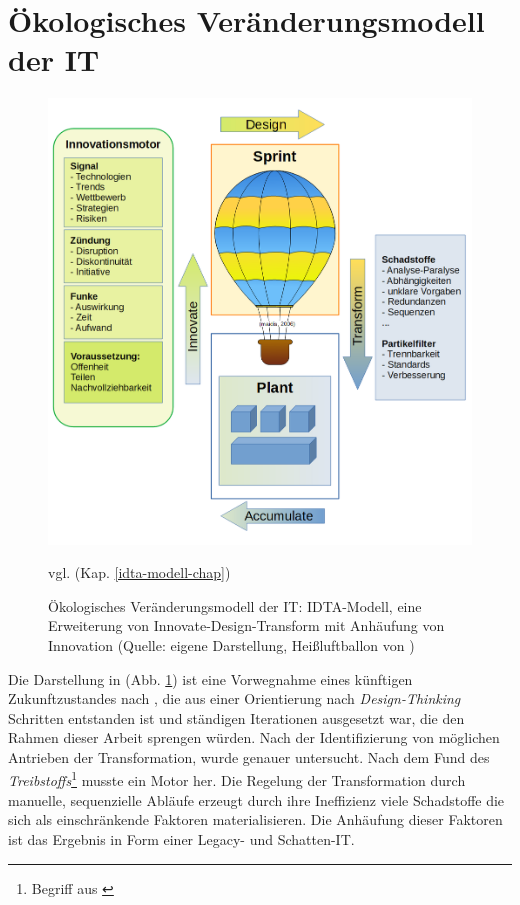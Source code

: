 \section{Ökologisches Veränderungsmodell der IT}
\begin{figure}[htbp]
 \centering
 \includegraphics[width=1.0\textwidth]{gfx/digital-transformation-lifecycle-by-selim4.PNG}
 \caption{Ökologisches Veränderungsmodell der IT: IDTA-Modell, eine Erweiterung von Innovate-Design-Transform \cite{Koch2016} mit Anhäufung von Innovation \cite{Ganswindt2006} (Quelle: eigene Darstellung, Heißluftballon von \citet{maidis_2006})\label{fig:digit-trans-idt}
 } vgl. (Kap. \ref{idta-modell-chap})
 \end{figure}

Die Darstellung in (Abb. \ref{fig:digit-trans-idt}) ist eine Vorwegnahme eines künftigen Zukunftzustandes nach \cite{Alt2017}, die aus einer Orientierung nach \emph{Design-Thinking} Schritten entstanden ist und ständigen Iterationen ausgesetzt war, die den Rahmen dieser Arbeit sprengen würden. Nach der Identifizierung von möglichen Antrieben der Transformation, wurde \cite{Ganswindt2006} genauer untersucht. Nach dem Fund des \emph{Treibstoffs}\footnote{Begriff aus \cite{Ganswindt2006}}  musste ein Motor her. Die Regelung der Transformation durch manuelle, sequenzielle Abläufe erzeugt durch ihre Ineffizienz viele Schadstoffe die sich als einschränkende Faktoren materialisieren. Die Anhäufung dieser Faktoren ist das Ergebnis in Form einer Legacy- und Schatten-IT.

